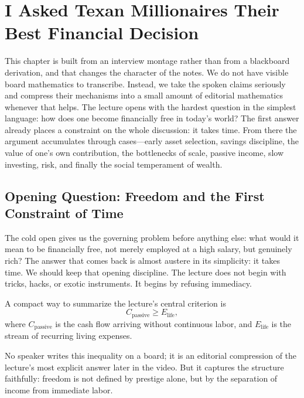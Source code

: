 \chapter{I Asked Texan Millionaires Their Best Financial Decision}

This chapter is built from an interview montage rather than from a blackboard derivation, and that changes the character of the notes. We do not have visible board mathematics to transcribe. Instead, we take the spoken claims seriously and compress their mechanisms into a small amount of editorial mathematics whenever that helps. The lecture opens with the hardest question in the simplest language: how does one become financially free in today's world? The first answer already places a constraint on the whole discussion: it takes time. From there the argument accumulates through cases---early asset selection, savings discipline, the value of one's own contribution, the bottlenecks of scale, passive income, slow investing, risk, and finally the social temperament of wealth.

\section{Opening Question: Freedom and the First Constraint of Time}

The cold open gives us the governing problem before anything else: what would it mean to be financially free, not merely employed at a high salary, but genuinely rich? The answer that comes back is almost austere in its simplicity: it takes time. We should keep that opening discipline. The lecture does not begin with tricks, hacks, or exotic instruments. It begins by refusing immediacy.

\begin{definition}
A compact way to summarize the lecture's central criterion is
\begin{equation}
C_{\text{passive}} \ge E_{\text{life}},
\end{equation}
where $C_{\text{passive}}$ is the cash flow arriving without continuous labor, and $E_{\text{life}}$ is the stream of recurring living expenses.
\end{definition}

\begin{remark}
No speaker writes this inequality on a board; it is an editorial compression of the lecture's most explicit answer later in the video. But it captures the structure faithfully: freedom is not defined by prestige alone, but by the separation of income from immediate labor.
\end{remark}

